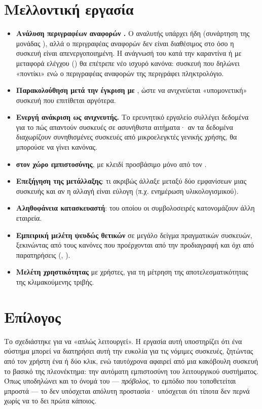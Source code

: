 \section{Μελλοντική εργασία}
\label{sec:future}

\begin{itemize}
  \item \textbf{Ανάλυση περιγραφέων αναφορών .} Ο αναλυτής υπάρχει ήδη
        (συνάρτηση  της μονάδας ), αλλά ο περιγραφέας αναφορών
        δεν είναι διαθέσιμος στο  όσο η συσκευή είναι απενεργοποιημένη.
        Η ανάγνωσή του κατά την καραντίνα ή με μεταφορά ελέγχου () θα επέτρεπε νέο ισχυρό κανόνα: συσκευή που δηλώνει «ποντίκι»
        ενώ ο περιγραφέας αναφορών της περιγράφει πληκτρολόγιο.
  \item \textbf{Παρακολούθηση μετά την έγκριση με }, ώστε να
        ανιχνεύεται «υπομονετική» συσκευή που επιτίθεται αργότερα.
  \item \textbf{Ενεργή ανάκριση ως ανιχνευτής.} Το ερευνητικό εργαλείο
         συλλέγει δεδομένα για το πώς απαντούν συσκευές σε
        ασυνήθιστα αιτήματα· αν τα δεδομένα διαχωρίζουν συνηθισμένες συσκευές από
        μικροελεγκτές γενικής χρήσης, θα μπορούσε να γίνει κανόνας.
  \item \textbf{ στον χώρο εμπιστοσύνης}, με κλειδί προσβάσιμο μόνο από
        τον .
  \item \textbf{Επεξήγηση της μετάλλαξης}: τι ακριβώς άλλαξε μεταξύ δύο
        εμφανίσεων μιας συσκευής και αν η αλλαγή είναι εύλογη (π.χ. ενημέρωση
        υλικολογισμικού).
  \item \textbf{Αληθοφάνεια κατασκευαστή}:  του οποίου οι συμβολοσειρές
        κατονομάζουν άλλη εταιρεία.
  \item \textbf{Εμπειρική μελέτη ψευδώς θετικών} σε μεγάλο δείγμα πραγματικών
        συσκευών, ξεκινώντας από τους κανόνες που προέρχονται από την
        προδιαγραφή και όχι από παρατηρήσεις (,
        ).
  \item \textbf{Μελέτη χρηστικότητας} με χρήστες, για τη μέτρηση της
        αποτελεσματικότητας της κλιμακούμενης τριβής.
\end{itemize}

\section{Επίλογος}

Το  σχεδιάστηκε για να «απλώς λειτουργεί». Η εργασία αυτή υποστηρίζει ότι
ένα σύστημα μπορεί να διατηρήσει αυτή την ευκολία για τις νόμιμες συσκευές,
ζητώντας από τον χρήστη ένα ή δύο κλικ, ενώ ταυτόχρονα αφαιρεί από μια κακόβουλη
συσκευή το βασικό της πλεονέκτημα: την αυτόματη εμπιστοσύνη του λειτουργικού
συστήματος. Όπως υποδηλώνει και το όνομά του — \emph{πρόβολος}, το εμπόδιο που
τοποθετείται μπροστά — το \Probolos{} δεν υπόσχεται απόλυτη προστασία· υπόσχεται
ότι τίποτα δεν περνά χωρίς να το δει πρώτα κάποιος.
